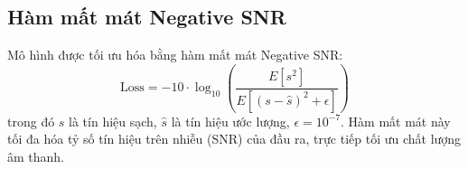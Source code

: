 \subsection{Hàm mất mát Negative SNR}

Mô hình được tối ưu hóa bằng hàm mất mát Negative SNR:
\begin{equation}
\text{Loss} = -10 \cdot \log_{10}\left(\frac{E[s^2]}{E[(s - \hat{s})^2 + \epsilon]}\right)
\end{equation}
trong đó $s$ là tín hiệu sạch, $\hat{s}$ là tín hiệu ước lượng, $\epsilon = 10^{-7}$.
Hàm mất mát này tối đa hóa tỷ số tín hiệu trên nhiễu (SNR) của đầu ra,
trực tiếp tối ưu chất lượng âm thanh.
